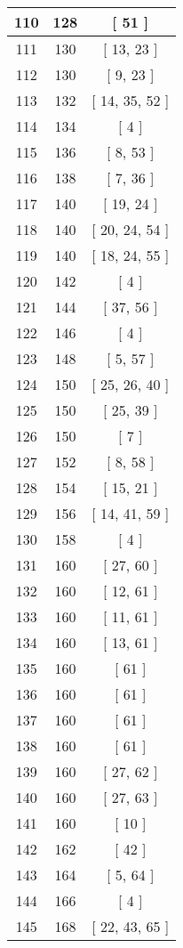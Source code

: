 \begin{center}
\begin{longtable}[H]{|| c c c ||}
\hline
110 & 128 & [ 51 ] \\ 
\hline
111 & 130 & [ 13, 23 ] \\ 
\hline
112 & 130 & [ 9, 23 ] \\ 
\hline
113 & 132 & [ 14, 35, 52 ] \\ 
\hline
114 & 134 & [ 4 ] \\ 
\hline
115 & 136 & [ 8, 53 ] \\ 
\hline
116 & 138 & [ 7, 36 ] \\ 
\hline
117 & 140 & [ 19, 24 ] \\ 
\hline
118 & 140 & [ 20, 24, 54 ] \\ 
\hline
119 & 140 & [ 18, 24, 55 ] \\ 
\hline
120 & 142 & [ 4 ] \\ 
\hline
121 & 144 & [ 37, 56 ] \\ 
\hline
122 & 146 & [ 4 ] \\ 
\hline
123 & 148 & [ 5, 57 ] \\ 
\hline
124 & 150 & [ 25, 26, 40 ] \\ 
\hline
125 & 150 & [ 25, 39 ] \\ 
\hline
126 & 150 & [ 7 ] \\ 
\hline
127 & 152 & [ 8, 58 ] \\ 
\hline
128 & 154 & [ 15, 21 ] \\ 
\hline
129 & 156 & [ 14, 41, 59 ] \\ 
\hline
130 & 158 & [ 4 ] \\ 
\hline
131 & 160 & [ 27, 60 ] \\ 
\hline
132 & 160 & [ 12, 61 ] \\ 
\hline
133 & 160 & [ 11, 61 ] \\ 
\hline
134 & 160 & [ 13, 61 ] \\ 
\hline
135 & 160 & [ 61 ] \\ 
\hline
136 & 160 & [ 61 ] \\ 
\hline
137 & 160 & [ 61 ] \\ 
\hline
138 & 160 & [ 61 ] \\ 
\hline
139 & 160 & [ 27, 62 ] \\ 
\hline
140 & 160 & [ 27, 63 ] \\ 
\hline
141 & 160 & [ 10 ] \\ 
\hline
142 & 162 & [ 42 ] \\ 
\hline
143 & 164 & [ 5, 64 ] \\ 
\hline
144 & 166 & [ 4 ] \\ 
\hline
145 & 168 & [ 22, 43, 65 ] \\ 

\end{longtable}
\end{center}

